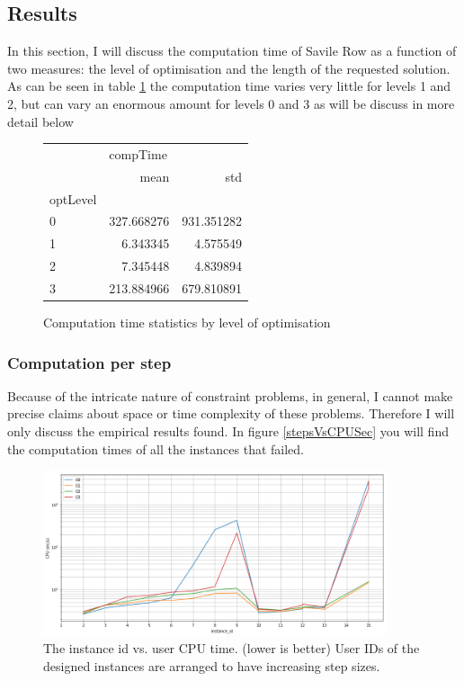\documentclass[british]{article}
\begin{document}
	\subsection{Results}
	In this section, I will discuss the computation time of Savile Row as a function of two measures: the level of optimisation and the length of the requested solution. As can be seen in table \ref{compstats} the computation time varies very little for levels 1 and 2, but can vary an enormous amount for levels 0 and 3 as will be discuss in more detail below 
	\begin{figure}[!h]
		\centering
		\begin{tabular}{lrr}
			\toprule
			{} & \multicolumn{2}{l}{compTime} \\
			{} &        mean &         std \\
			optLevel &             &             \\
			\midrule
			0        &  327.668276 &  931.351282 \\
			1        &    6.343345 &    4.575549 \\
			2        &    7.345448 &    4.839894 \\
			3        &  213.884966 &  679.810891 \\
			\bottomrule
		\end{tabular}
		\caption{Computation time statistics by level of optimisation}
		\label{compstats}	
		
	\end{figure}
	
	\subsubsection{Computation per step}
	Because of the intricate nature of constraint problems, in general, I cannot make precise claims about space or time complexity of these problems. Therefore I will only discuss the empirical results found. In figure \ref{stepsVsCPUSec} you will find the computation times of all the instances that failed.
	\FloatBarrier
	\begin{figure}[!ht]
		\centering
		\includegraphics[width=0.9\textwidth]{idVsCPUSec}
		\caption{The instance id vs. user CPU time. (lower is better) User IDs of the designed instances are arranged to have increasing step sizes.}
		\label{idVsCPUSec}	
	\end{figure}
	\FloatBarrier 
	
\end{document}

